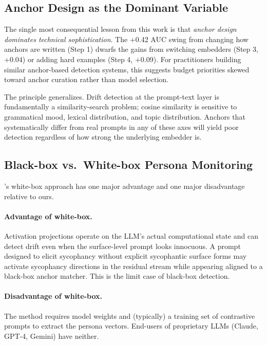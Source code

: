 
\subsection{Anchor Design as the Dominant Variable}
\label{sec:discussion-anchors}

The single most consequential lesson from this work is that
\emph{anchor design dominates technical sophistication}. The
+0.42 AUC swing from changing how anchors are written (Step 1)
dwarfs the gains from switching embedders (Step 3, +0.04) or
adding hard examples (Step 4, +0.09). For practitioners building
similar anchor-based detection systems, this suggests budget
priorities skewed toward anchor curation rather than model
selection.

The principle generalizes. Drift detection at the prompt-text
layer is fundamentally a similarity-search problem; cosine
similarity is sensitive to grammatical mood, lexical distribution,
and topic distribution. Anchors that systematically differ from
real prompts in any of these axes will yield poor detection
regardless of how strong the underlying embedder is.

\subsection{Black-box vs.\ White-box Persona Monitoring}
\label{sec:discussion-bw}

\citet{personavectors2025}'s white-box approach has one major
advantage and one major disadvantage relative to ours.

\paragraph{Advantage of white-box.} Activation projections operate
on the LLM's actual computational state and can detect drift even
when the surface-level prompt looks innocuous. A prompt designed
to elicit sycophancy without explicit sycophantic surface forms
may activate sycophancy directions in the residual stream while
appearing aligned to a black-box anchor matcher. This is the limit
case of black-box detection.

\paragraph{Disadvantage of white-box.} The method requires model
weights and (typically) a training set of contrastive prompts to
extract the persona vectors. End-users of proprietary LLMs
(Claude, GPT-4, Gemini) have neither.

